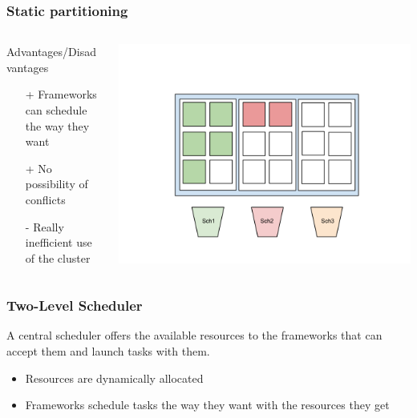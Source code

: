 \documentclass[notes]{beamer}
\begin{document}
  \begin{frame}
    \frametitle{Static partitioning}
       \begin{columns}[T]
       \begin{column}{.5\textwidth}
        \begin{block}{Advantages/Disadvantages}

            \begin{itemize}
              \item[+] Frameworks can schedule the way they want 
              \item[+] No possibility of conflicts
              \item[-] Really inefficient use of the cluster
            \end{itemize}
        \end{block}
        \end{column}
        \begin{column}{.6\textwidth}
         \includegraphics[trim = 0mm 0mm 50mm 0mm,clip,scale=0.20,natwidth=960,natheight=720]{StaticPartitioning.png}
        \end{column}
      \end{columns}
  \end{frame}

  \note{}

  \begin{frame}
    \frametitle{Two-Level Scheduler}
    \begin{definition}
      A central scheduler offers the available resources to
      the frameworks that can accept them and launch tasks
      with them.
    \end{definition}
    \begin{itemize}
      \item Resources are dynamically allocated
      \item Frameworks schedule tasks the way they want
        with the resources they get
    \end{itemize}
  \end{frame}
\end{document}
